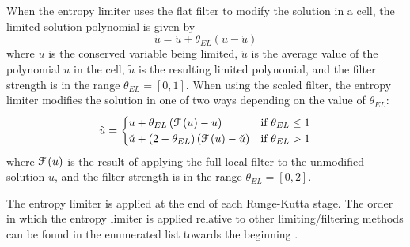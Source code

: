 \begin{nmldescbody}

When the entropy limiter uses the flat filter to modify the solution in a cell,
the limited solution polynomial is given by
%
\begin{equation}
  \tilde{u} = \check{u} + \theta_{EL}\left(u-\check{u}\right)
  \label{EQN:ELFlatSolution}
\end{equation}
%
where $u$ is the conserved variable being limited, $\check{u}$ is the average
value of the polynomial $u$ in the cell, $\tilde{u}$ is the resulting
limited polynomial, and the filter strength is in the range $\theta_{EL} =
\left[0,1\right]$.
%
When using the scaled filter, the entropy limiter modifies the solution in one
of two ways depending on the value of $\theta_{EL}$:
%
\begin{equation}
  \tilde{u} = 
  \begin{cases}
    u + \theta_{EL}\left({\cal F}\left(u\right) - u\right) & 
       \textrm{if } \theta_{EL} \leq 1 \\
    \check{u} + \left(2-\theta_{EL}\right) \left({\cal F}\left(u\right) -
    \check{u}\right) &
       \textrm{if } \theta_{EL} > 1
  \end{cases}
  \label{EQN:ELScaledSolution}
\end{equation}
%
where ${\cal F}\left(u\right)$ is the result of applying the full local filter
to the unmodified solution $u$, and the filter strength is in the range
$\theta_{EL} = \left[0,2\right]$.
  

The entropy limiter is applied at the end of each Runge-Kutta stage.
%
The order in which the entropy limiter is applied relative to other
limiting\slash filtering methods can be found in the enumerated list towards the
beginning .
%



\end{nmldescbody}

